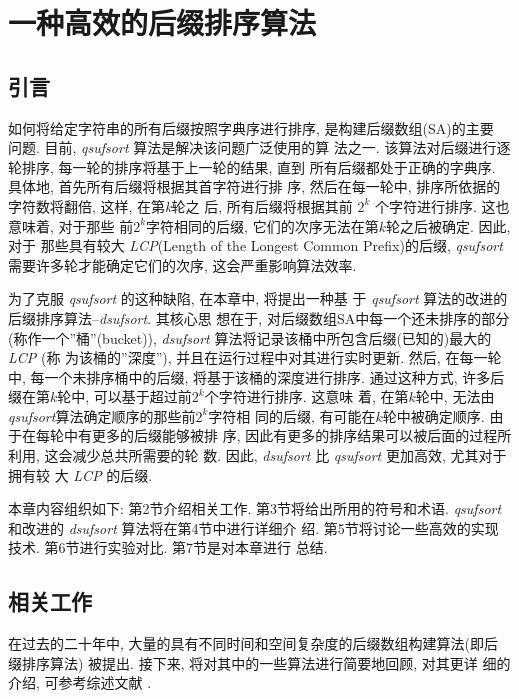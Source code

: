 \documentclass{ws-ijprai}
\begin{document}

\chapter{一种高效的后缀排序算法}
\section{引言}
\label{sec:introduction}

如何将给定字符串的所有后缀按照字典序进行排序, 是构建后缀数组(SA)的主要
问题. 目前, \emph{qsufsort}\cite{qsufsort} 算法是解决该问题广泛使用的算
法之一. 该算法对后缀进行逐轮排序, 每一轮的排序将基于上一轮的结果, 直到
所有后缀都处于正确的字典序. 具体地, 首先所有后缀将根据其首字符进行排
序, 然后在每一轮中, 排序所依据的字符数将翻倍, 这样, 在第\emph{k}轮之
后, 所有后缀将根据其前 $2^{k}$ 个字符进行排序. 这也意味着, 对于那些
前$2^{k}$字符相同的后缀, 它们的次序无法在第$k$轮之后被确定. 因此, 对于
那些具有较大 \emph{LCP}(Length of the Longest Common Prefix)的后缀,
\emph{qsufsort} 需要许多轮才能确定它们的次序, 这会严重影响算法效率.

为了克服 \emph{qsufsort} 的这种缺陷, 在本章中, 将提出一种基
于 \emph{qsufsort} 算法的改进的后缀排序算法--\emph{dsufsort}. 其核心思
想在于, 对后缀数组SA中每一个还未排序的部分(称作一个''桶''(bucket)),
\emph{dsufsort} 算法将记录该桶中所包含后缀(已知的)最大的\emph{LCP} (称
为该桶的''深度''), 并且在运行过程中对其进行实时更新. 然后, 在每一轮中,
每一个未排序桶中的后缀, 将基于该桶的深度进行排序. 通过这种方式, 许多后
缀在第$k$轮中, 可以基于超过前$2^k$个字符进行排序. 这意味
着, 在第$k$轮中, 无法由\emph{qsufsort}算法确定顺序的那些前$2^{k}$字符相
同的后缀, 有可能在$k$轮中被确定顺序. 由于在每轮中有更多的后缀能够被排
序, 因此有更多的排序结果可以被后面的过程所利用, 这会减少总共所需要的轮
数. 因此, \emph{dsufsort} 比 \emph{qsufsort} 更加高效, 尤其对于拥有较
大 \emph{LCP} 的后缀.

本章内容组织如下: 第2节介绍相关工作. 第3节将给出所用的符号和术语.
\emph{qsufsort} 和改进的 \emph{dsufsort} 算法将在第4节中进行详细介
绍. 第5节将讨论一些高效的实现技术. 第6节进行实验对比. 第7节是对本章进行
总结.

\section{相关工作}

在过去的二十年中, 大量的具有不同时间和空间复杂度的后缀数组构建算法(即后
缀排序算法) 被提出. 接下来, 将对其中的一些算法进行简要地回顾, 对其更详
细的介绍, 可参考综述文献 \cite{survey1,survey2}.
\end{document}
